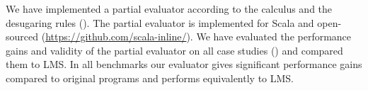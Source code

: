 We have implemented a partial evaluator according to the \calculus calculus and the desugaring rules (). The partial evaluator is implemented for Scala and open-sourced (\url{https://github.com/scala-inline/}). We have evaluated the performance gains and validity of the partial evaluator on all case studies () and compared them to LMS. In all benchmarks our evaluator gives significant performance gains compared to original programs and performs equivalently to LMS.